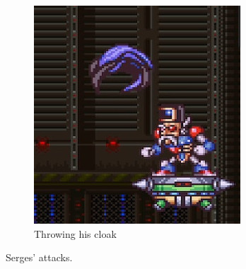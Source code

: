 \begin{figure}[htp]
\begin{subfigure}{0.25\linewidth}
		\includegraphics[width=\linewidth]{figures/X2/Hunter_stages/Serges_cloak.jpg}
		\caption{Throwing his cloak}
	\end{subfigure}
	\caption{Serges' attacks.}	
\end{figure}

